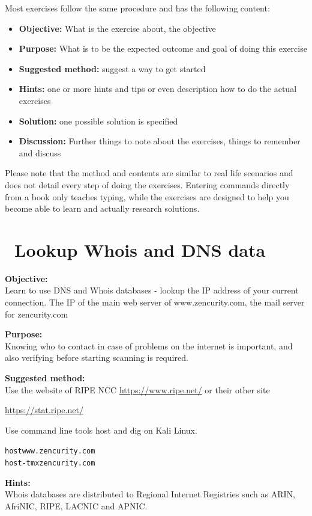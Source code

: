 \documentclass[a4paper,11pt,notitlepage]{report}
\begin{document}
Most exercises follow the same procedure and has the following content:
\begin{itemize}
\item {\bf Objective:} What is the exercise about, the objective
\item {\bf Purpose:} What is to be the expected outcome and goal of doing this exercise
\item {\bf Suggested method:} suggest a way to get started
\item {\bf Hints:} one or more hints and tips or even description how to
do the actual exercises
\item {\bf Solution:} one possible solution is specified
\item {\bf Discussion:} Further things to note about the exercises, things to remember and discuss
\end{itemize}

Please note that the method and contents are similar to real life scenarios and does not detail every step of doing the exercises. Entering commands directly from a book only teaches typing, while the exercises are designed to help you become able to learn and actually research solutions.


\chapter{\faInfoCircle\ Lookup Whois and DNS data}
\label{ex:whois-dns}


{\bf Objective:} \\
Learn to use DNS and Whois databases - lookup the IP address of your current connection. The IP of the main web server of www.zencurity.com, the mail server for zencurity.com

{\bf Purpose:}\\
Knowing who to contact in case of problems on the internet is important, and also verifying before starting scanning is required.

{\bf Suggested method:}\\
Use the website of RIPE NCC \url{https://www.ripe.net/} or their other site

\url{https://stat.ripe.net/}

Use command line tools host and dig on Kali Linux.
\begin{alltt}
host www.zencurity.com
host -t mx zencurity.com
\end{alltt}

{\bf Hints:}\\
Whois databases are distributed to Regional Internet Registries such as ARIN, AfriNIC, RIPE, LACNIC and APNIC.
\end{document}
